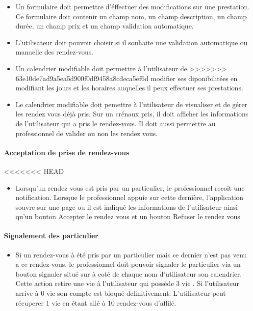 \documentclass{article}
\begin{document}
\begin{itemize}
\begin{itemize}
\item Un formulaire doit permettre d'éffectuer des modifications sur
  une prestation. Ce formulaire doit contenir un champ nom, un champ description, un champ
  durée, un champ prix et un champ validation automatique.
\item L'utilisateur doit pouvoir choisir si il souhaite une validation automatique ou manuelle des rendez-vous.
\item Un calendrier modifiable doit permettre à l'utilisateur de
>>>>>>> 63e10de7ad9a5ea5d900f0df9458a8cdeca5ef6d
  modifier ses diponibilitées en modifiant les jours et les horaires
  auquelles il peux effectuer ses prestations.
\item Le calendrier modifiable doit pemettre à l'utilisateur de
  visualiser et de gérer les rendez vous déjà pris. Sur un crénaux
  pris, il doit afficher les informations de l'utilisateur qui a pris
  le rendez-vous. Il doit aussi permettre au professionnel de valider
  ou non les rendez vous.
\end{itemize}

\paragraph{Acceptation de prise de rendez-vous}
<<<<<<< HEAD
\begin{itemize}
\item Lorsqu'un rendez vous est pris par un particulier, le
  professionnel recoit une notification. Lorsque le professionnel
  appuie sur cette dernière, l'application souvre sur une page ou il
  est indiqué les informations de l'utilisateur ainsi qu'un bouton \og
  Accepter le rendez vous \fg{} et un bouton \og
  Refuser le rendez vous \fg{}
\end{itemize}
\paragraph{Signalement des particulier}
\begin{itemize}
\item Si un rendez-vous à été pris par un particulier mais ce dernier
  n'est pas venu a ce rendez-vous, le professionnel doit pouvoir
  signaler le particulier via un bouton \og signaler \fg{} situé sur
  à coté de chaque nom d'utilisateur son calendrier. Cette action retire une \og vie \fg{} à l'utilisateur qui possède
  3 \og vie \fg{}. Si l'utilisateur arrive à 0 vie son compte est
  bloqué definitivement. L'utilisateur peut récuperer 1 vie en étant
  allé à 10 rendez-vous d'affilé.
\end{itemize}


\end{itemize}
\end{document}
